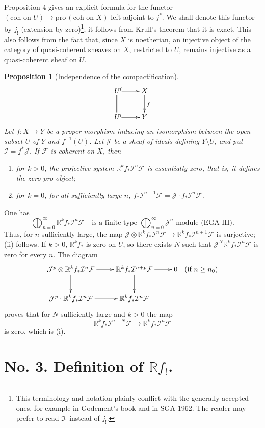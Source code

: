 \documentclass[12pt]{amsart}
\theoremstyle{plain}
\newtheorem{prop}{Proposition}
\theoremstyle{definition}
\newcommand{\Pro}{\text{pro}\,}
\newcommand{\cF}{\mathcal{F}}
\newcommand{\cI}{\mathcal{I}}
\newcommand{\cJ}{\mathcal{J}}
\newcommand{\bR}{\mathbb{R}}
\begin{document}
Proposition 4 gives an explicit formula for the functor $(\text{coh on }U)\to\Pro(\text{coh on }X)$ left adjoint to $j^*$. We shall denote this functor by $j_!$ (extension by zero)\footnote{This terminology and notation plainly conflict with the generally accepted ones, for example in Godement's book and in SGA 1962. The reader may prefer to read $\mathfrak I_!$ instead of $j_!$.}; it follows from Krull's theorem that it is exact. This also follows from the fact that, since $X$ is noetherian, an injective object of the category of quasi-coherent sheaves on $X$, restricted to $U$, remains injective as a quasi-coherent sheaf on $U$.

\begin{prop}[Independence of the compactification]
\[
\xymatrix{
U \ar@{^{(}->}[r] \ar@{=}[d] & X \ar[d]^f \\
U \ar@{^{(}->}[r] & Y
}
\]
Let $f:X\to Y$ be a proper morphism inducing an isomorphism between the open subset $U$ of $Y$ and $f^{-1}(U)$. Let $\cJ$ be a sheaf of ideals defining $Y\setminus U$, and put $\cI=f^*\cJ$. If $\cF$ is coherent on $X$, then
\begin{enumerate}
\item[(i)] for $k>0$, the projective system $\bR^kf_*\cI^n\cF$ is essentially zero, that is, it defines the zero pro-object;
\item[(ii)] for $k=0$, for all sufficiently large $n$, $f_*\cI^{n+1}\cF=\cJ\cdot f_*\cI^n\cF$.
\end{enumerate}
\end{prop}

One has
\[
\bigoplus_{n=0}^{\infty}\bR^kf_*\cI^n\cF\quad\text{is a finite type }\bigoplus_{n=0}^{\infty}\cJ^n\text{-module (EGA III)}.
\]
Thus, for $n$ sufficiently large, the map $\cJ\otimes\bR^kf_*\cI^n\cF\to\bR^kf_*\cI^{n+1}\cF$ is surjective; (ii) follows. If $k>0$, $\bR^kf_*$ is zero on $U$, so there exists $N$ such that $\cJ^N\bR^kf_*\cI^n\cF$ is zero for every $n$. The diagram
\[
\xymatrix{
\cJ^p\otimes\bR^kf_*\cI^n\cF \ar[r] \ar[d] & \bR^kf_*\cI^{n+p}\cF \ar[r] \ar[d] & 0 \quad (\text{if } n\ge n_0) \\
\cJ^p\cdot\bR^kf_*\cI^n\cF \ar[r] & \bR^kf_*\cI^n\cF
}
\]
proves that for $N$ sufficiently large and $k>0$ the map
\[
\bR^kf_*\cI^{n+N}\cF\to\bR^kf_*\cI^n\cF
\]
is zero, which is (i).

\section*{No. 3. Definition of $\bR f_!$.}
\end{document}

